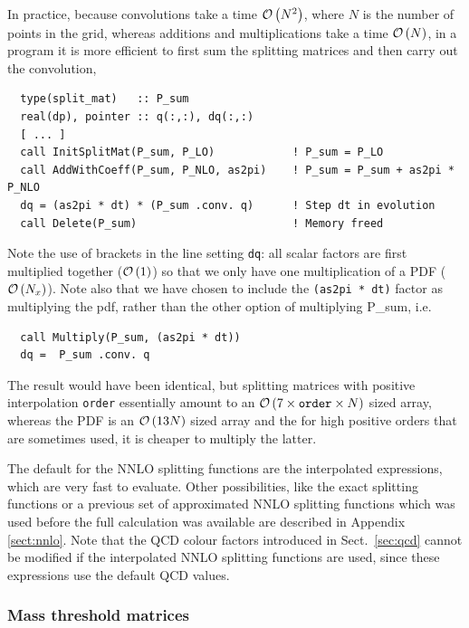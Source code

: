 \documentclass[12pt]{article}
\newcommand{\ie}{i.e.\ }
\newcommand{\ttt}[1]{\texttt{#1}}
\newcommand{\order}[1]{{\cal O}\left(#1\right)}
\begin{document}
In practice, because convolutions take a time $\order{N^2}$, where
$N$ is the number of points in the grid, whereas
additions and multiplications take a time $\order{N}$, in a program it
is more efficient to first sum the splitting matrices and then carry out the
convolution,
\begin{lstlisting}
  type(split_mat)   :: P_sum
  real(dp), pointer :: q(:,:), dq(:,:)
  [ ... ]
  call InitSplitMat(P_sum, P_LO)            ! P_sum = P_LO
  call AddWithCoeff(P_sum, P_NLO, as2pi)    ! P_sum = P_sum + as2pi * P_NLO
  dq = (as2pi * dt) * (P_sum .conv. q)      ! Step dt in evolution
  call Delete(P_sum)                        ! Memory freed
\end{lstlisting}
Note the use of brackets in the line setting \ttt{dq}: all scalar
factors are first multiplied together ($\order{1}$) so that we only
have one multiplication of a PDF ($\order{N_x}$). Note also that we have
chosen to include the \ttt{(as2pi * dt)} factor as multiplying the
pdf, rather than the other option of multiplying {P\_sum}, \ie 
\begin{lstlisting}
  call Multiply(P_sum, (as2pi * dt))
  dq =  P_sum .conv. q
\end{lstlisting}
The result would have been identical, but splitting matrices with
positive interpolation \ttt{order} essentially amount to an
$\order{7\times \ttt{order} \times N}$ sized array, whereas the PDF is
an $\order{13 N}$ sized array and the for high positive orders that
are sometimes used, it is cheaper to multiply the latter. 

The default for the NNLO splitting functions are the interpolated
expressions, which are very fast
to evaluate. Other possibilities, like
the exact splitting functions or a previous set of approximated NNLO
splitting functions which was used before the full
calculation was available are described in Appendix \ref{sect:nnlo}.
Note that the QCD colour factors introduced in Sect.~\ref{sec:qcd}
cannot be modified if the interpolated NNLO splitting functions
are used, since these expressions use the default QCD values.





\subsubsection{Mass threshold matrices}
\label{sec:mtm}
\end{document}
